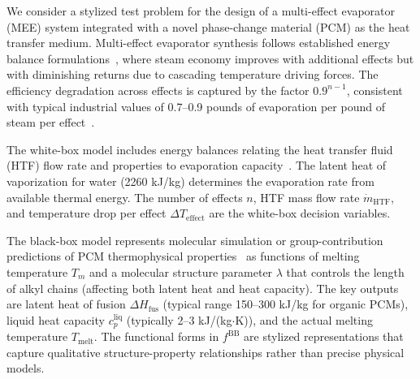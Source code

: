 \documentclass[12pt,a4paper]{article}%
\theoremstyle{plain}%
\theoremstyle{remark}%
\theoremstyle{definition}%
\def\BB{\mathrm{BB}}
\begin{document}
\begin{appendices}
We consider a stylized test problem for the design of a multi-effect evaporator (MEE) system integrated with a novel phase-change material (PCM) as the heat transfer medium. Multi-effect evaporator synthesis follows established energy balance formulations~\cite{hillenbrand1988synthesis}, where steam economy improves with additional effects but with diminishing returns due to cascading temperature driving forces. The efficiency degradation across effects is captured by the factor $0.9^{n-1}$, consistent with typical industrial values of 0.7--0.9 pounds of evaporation per pound of steam per effect~\cite{swenson2024mee}.

The white-box model includes energy balances relating the heat transfer fluid (HTF) flow rate and properties to evaporation capacity~\cite{ahmetovic2018simultaneous}. The latent heat of vaporization for water (2260 kJ/kg) determines the evaporation rate from available thermal energy. The number of effects $n$, HTF mass flow rate $\dot{m}_{\text{HTF}}$, and temperature drop per effect $\Delta T_{\text{effect}}$ are the white-box decision variables.

The black-box model represents molecular simulation or group-contribution predictions of PCM thermophysical properties~\cite{sharma2009review,zalba2003review} as functions of melting temperature $T_m$ and a molecular structure parameter $\lambda$ that controls the length of alkyl chains (affecting both latent heat and heat capacity). The key outputs are latent heat of fusion $\Delta H_{\text{fus}}$ (typical range 150--300 kJ/kg for organic PCMs), liquid heat capacity $c_p^{\text{liq}}$ (typically 2--3 kJ/(kg$\cdot$K)), and the actual melting temperature $T_{\text{melt}}$. The functional forms in $f^\BB$ are stylized representations that capture qualitative structure-property relationships rather than precise physical models.


\end{appendices}
\end{document}
